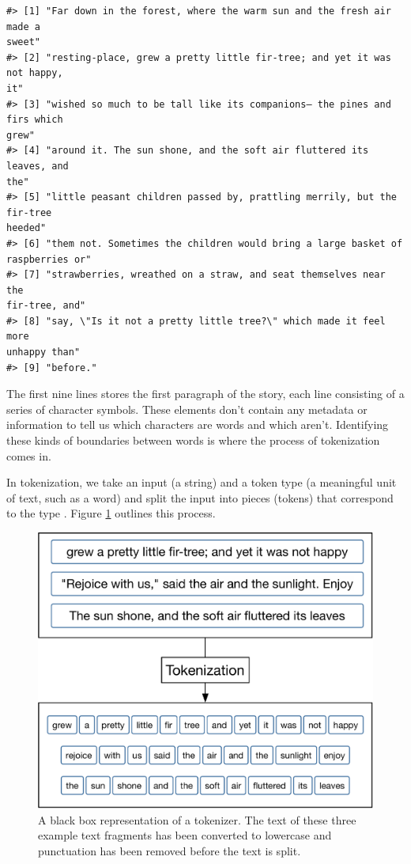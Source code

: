 \documentclass[
]{krantz}
\begin{document}
\begin{verbatim}
#> [1] "Far down in the forest, where the warm sun and the fresh air made a
sweet"
#> [2] "resting-place, grew a pretty little fir-tree; and yet it was not happy,
it"
#> [3] "wished so much to be tall like its companions– the pines and firs which
grew"
#> [4] "around it. The sun shone, and the soft air fluttered its leaves, and
the"
#> [5] "little peasant children passed by, prattling merrily, but the fir-tree
heeded"
#> [6] "them not. Sometimes the children would bring a large basket of
raspberries or"
#> [7] "strawberries, wreathed on a straw, and seat themselves near the
fir-tree, and"
#> [8] "say, \"Is it not a pretty little tree?\" which made it feel more
unhappy than"
#> [9] "before."
\end{verbatim}

The first nine lines stores the first paragraph of the story, each line consisting of a series of character symbols.
These elements don't contain any metadata or information to tell us which characters are words and which aren't. Identifying these kinds of boundaries between words is where the process of tokenization comes in.

In tokenization, we take an input (a string) and a token type (a meaningful unit of text, such as a word) and split the input into pieces (tokens) that correspond to the type \citep{Manning:2008:IIR:1394399}. Figure \ref{fig:tokenizationdiag} outlines this process.

\begin{figure}

{\centering \includegraphics[width=0.9\linewidth]{diagram-files/tokenization-black-box} 

}

\caption{A black box representation of a tokenizer. The text of these three example text fragments has been converted to lowercase and punctuation has been removed before the text is split.}\label{fig:tokenizationdiag}
\end{figure}
\end{document}
